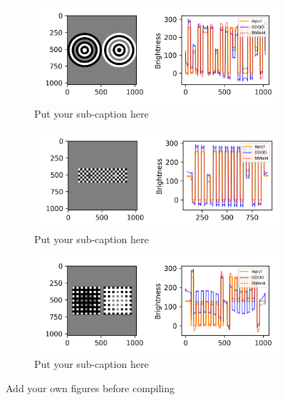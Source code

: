 \begin{figure}[H]
    \centering
    \begin{subfigure}{0.7\textwidth}
        \includegraphics[width=\textwidth]{media/model_responses/both_white_circular.png}
        \caption{Put your sub-caption here}
    \end{subfigure}
    \begin{subfigure}{0.7\textwidth}
        \includegraphics[width=\textwidth]{media/model_responses/both_checkerboard.png}
        \caption{Put your sub-caption here}
    \end{subfigure}
    \begin{subfigure}{0.7\textwidth}
        \includegraphics[width=\textwidth]{media/model_responses/both_dungeon.png}
        \caption{Put your sub-caption here}
    \end{subfigure}
\caption{Add your own figures before compiling}
    \label{fig:foobar}
\end{figure}


